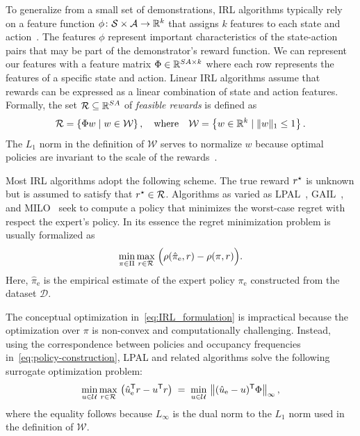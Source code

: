 \documentclass[10pt]{article}
\renewcommand{\cite}{\citep}
\theoremstyle{plain}
\theoremstyle{remark}
\begin{document}
To generalize from a small set of demonstrations, IRL algorithms typically rely on a feature function $\phi\colon \mathcal{S} \times \mathcal{A}\to \mathbb{R}^k$ that assigns $k$ features to each state and action~\cite{abbeel2004,Syed2008,Brown2018a,lacotte2019,chang2021mitigating,jonnavittula2021know,arora2021survey}. The features $\phi$ represent important characteristics of the state-action pairs that may be part of the demonstrator's reward function. We can represent our features with a feature matrix $\Phi \in \mathbb{R}^{SA\times k}$ where each row represents the features of a specific state and action. Linear IRL algorithms assume that rewards can be expressed as a linear combination of state and action features. Formally, the set $\mathcal{R} \subseteq \mathbb{R}^{SA}$ of \emph{feasible rewards} is defined as
\begin{equation} \label{eq:r-defintion}
  \mathcal{R} = \left\{ \Phi w \mid  w\in \mathcal{W} \right\}, \quad
  \text{where} \quad
  \mathcal{W} = \left\{ w \in \mathbb{R}^k \mid \| w \|_1 \le 1 \right\}. 
\end{equation}
The $L_1$ norm in the definition of $\mathcal{W}$ serves to normalize $w$ because optimal policies are invariant to the scale of the rewards~\cite{abbeel2004,Syed2008}. 

Most IRL algorithms adopt the following scheme. The true reward $r^{\mathnormal{\star}}$ is unknown but is assumed to satisfy that $r^{\mathnormal{\star}} \in \mathcal{R}$. Algorithms as varied as LPAL~\cite{Syed2008}, GAIL~\cite{Ho2016}, and MILO~\cite{chang2021mitigating} seek to compute a policy that minimizes the worst-case regret with respect the expert's policy. In its essence the regret minimization problem is usually formalized as
\begin{equation} \label{eq:IRL_formulation}
\min_{\pi \in \Pi} \max_{r \in \mathcal{R}} \; \Bigl( \rho(\hat{\pi}_{\mathrm{e}}, r) - \rho(\pi, r) \Bigr).
\end{equation}
Here, $\hat{\pi}_{\mathrm{e}}$ is the empirical estimate of the expert policy $\pi_{\mathrm{e}}$ constructed from the dataset $\mathcal{D}$.

The conceptual optimization in~\eqref{eq:IRL_formulation} is impractical because the optimization over $\pi$ is non-convex and computationally challenging. Instead, using the correspondence between policies and occupancy frequencies in~\eqref{eq:policy-construction}, LPAL and related algorithms solve the following surrogate optimization problem:
\begin{equation} \label{eq:irl-formulation-u}
  \min_{u\in \mathcal{U}} \max_{r\in \mathcal{R}} \, \left(\hat{u}_{\mathrm{e}}^{\mathsf{T}} r - u^{\mathsf{T}} r \right)
  \; =\; 
  \min_{u\in \mathcal{U}} \, \left\| (\hat{u}_{\mathrm{e}} - u)^{\mathsf{T}} \Phi \right\|_{\infty},
\end{equation}
where the equality follows because $L_{\infty}$ is the dual norm to the $L_1$ norm used in the definition of $\mathcal{W}$.
\end{document}
